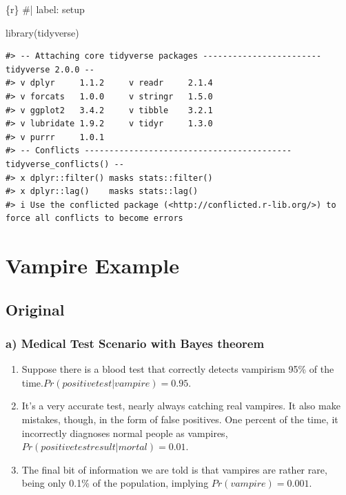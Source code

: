 \documentclass[
  letterpaper,
  DIV=11,
  numbers=noendperiod]{scrreprt}
\newenvironment{Shaded}{\begin{snugshade}}{\end{snugshade}}
\newcommand{\CommentTok}[1]{\textcolor[rgb]{0.37,0.37,0.37}{#1}}
\newcommand{\FunctionTok}[1]{\textcolor[rgb]{0.28,0.35,0.67}{#1}}
\newcommand{\InformationTok}[1]{\textcolor[rgb]{0.37,0.37,0.37}{#1}}
\newcommand{\NormalTok}[1]{\textcolor[rgb]{0.00,0.23,0.31}{#1}}
\providecommand{\tightlist}{%
  \setlength{\itemsep}{0pt}\setlength{\parskip}{0pt}}\usepackage{longtable,booktabs,array}
\begin{document}
\begin{Shaded}
\begin{Highlighting}[]
\InformationTok{\textasciigrave{}\textasciigrave{}\textasciigrave{}\{r\}}
\CommentTok{\#| label: setup}

\FunctionTok{library}\NormalTok{(tidyverse)}
\InformationTok{\textasciigrave{}\textasciigrave{}\textasciigrave{}}
\end{Highlighting}
\end{Shaded}

\begin{verbatim}
#> -- Attaching core tidyverse packages ------------------------ tidyverse 2.0.0 --
#> v dplyr     1.1.2     v readr     2.1.4
#> v forcats   1.0.0     v stringr   1.5.0
#> v ggplot2   3.4.2     v tibble    3.2.1
#> v lubridate 1.9.2     v tidyr     1.3.0
#> v purrr     1.0.1     
#> -- Conflicts ------------------------------------------ tidyverse_conflicts() --
#> x dplyr::filter() masks stats::filter()
#> x dplyr::lag()    masks stats::lag()
#> i Use the conflicted package (<http://conflicted.r-lib.org/>) to force all conflicts to become errors
\end{verbatim}

\hypertarget{vampire-example}{%
\section*{Vampire Example}\label{vampire-example}}


\hypertarget{original-9}{%
\subsection*{Original}\label{original-9}}

\hypertarget{a-medical-test-scenario-with-bayes-theorem}{%
\subsubsection*{a) Medical Test Scenario with Bayes
theorem}\label{a-medical-test-scenario-with-bayes-theorem}}

\begin{enumerate}
\def\labelenumi{\arabic{enumi}.}
\tightlist
\item
  Suppose there is a blood test that correctly detects vampirism 95\% of
  the time.\(Pr(positivetest|vampire) = 0.95\).
\item
  It's a very accurate test, nearly always catching real vampires. It
  also make mistakes, though, in the form of false positives. One
  percent of the time, it incorrectly diagnoses normal people as
  vampires, \(Pr(positive test result| mortal) = 0.01\).
\item
  The final bit of information we are told is that vampires are rather
  rare, being only 0.1\% of the population, implying
  \(Pr(vampire) = 0.001\).
\end{enumerate}
\end{document}
